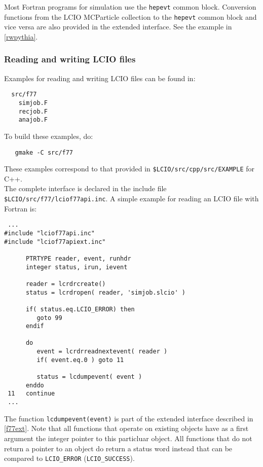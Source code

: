 Most Fortran programs for simulation use the \verb$hepevt$ common block. 
Conversion functions from the LCIO MCParticle collection to the \verb$hepevt$ common block and vice versa 
are also provided in the extended interface. See the example in \ref{rwpythia}.

\subsubsection{Reading and writing LCIO files}

Examples for reading and writing LCIO files can be found in:
\begin{verbatim}
  src/f77
    simjob.F
    recjob.F
    anajob.F
\end{verbatim}
To build these examples, do:
\begin{verbatim}
   gmake -C src/f77
\end{verbatim}

These examples correspond to that provided in \verb#$LCIO/src/cpp/src/EXAMPLE# for C++. \\
                                                                                       
The complete interface is declared in the include file \verb#$LCIO/src/f77/lciof77api.inc#. 
A simple example for reading an LCIO file with Fortran is:

\begin{verbatim}
 ...
#include "lciof77api.inc"
#include "lciof77apiext.inc"

      PTRTYPE reader, event, runhdr
      integer status, irun, ievent

      reader = lcrdrcreate()
      status = lcrdropen( reader, 'simjob.slcio' )
      
      if( status.eq.LCIO_ERROR) then
         goto 99
      endif

      do 
         event = lcrdrreadnextevent( reader )
         if( event.eq.0 ) goto 11 
         
         status = lcdumpevent( event )
      enddo
 11   continue
 ...
\end{verbatim}
The function \verb$lcdumpevent(event)$ is part of the extended interface described in \ref{f77ext}.
Note that all functions that operate on existing objects have as a first argument the integer pointer 
to this particluar object.
All functions that do not return a pointer to an object do return a status word instead that can be 
compared to \verb$LCIO_ERROR$ (\verb$LCIO_SUCCESS$).

